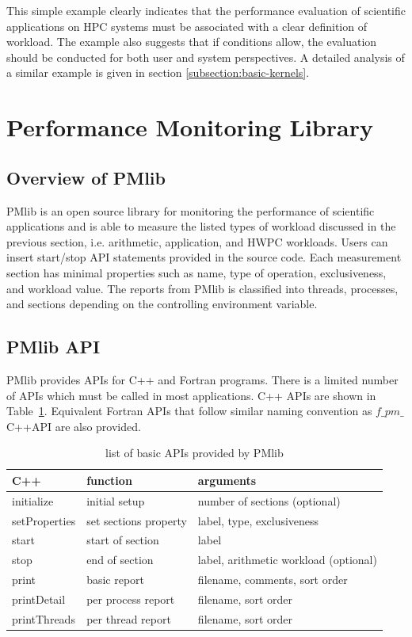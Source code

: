 \documentclass[conference]{IEEEtran}
\begin{document}
This simple example clearly indicates that the performance evaluation of
scientific applications on HPC systems must be associated with a clear
definition of workload. The example also suggests that if conditions allow, the evaluation should be
conducted for both user and system perspectives.
A detailed analysis of a similar example is given in section
\ref{subsection:basic-kernels}.

\section{Performance Monitoring Library}
\label{section:PMlib}

%
\subsection {Overview of PMlib}
PMlib is an open source library for monitoring the performance of scientific
applications and is able to measure the listed types of workload discussed
in the previous section, i.e. arithmetic, application, and HWPC workloads.
Users can insert start/stop API statements provided in the source code.
Each measurement section has minimal properties such as name, type of operation,
exclusiveness, and workload value.
The reports from PMlib is classified into threads, processes, and sections
depending on the controlling environment variable.

%
\subsection{PMlib API}
PMlib provides APIs for C++ and Fortran programs.
There is a limited number of APIs which must be called in most applications.
C++ APIs are shown in Table~\ref{tab:PMlib-API}. 
Equivalent Fortran APIs that follow similar naming convention as
$f\_pm\_${\footnotesize{C++API}} are also provided.

\begin{table}[htb]
\scriptsize
\caption{list of basic APIs provided by PMlib}
\label{tab:PMlib-API}
\footnotesize
\begin{tabular}{l|l|l} \hline
\scriptsize
C++	& function	&	arguments	\\ \hline \hline
initialize	& initial setup	& number of sections (optional)	\\ %
setProperties	& set sections property	& label, type, exclusiveness \\ %
start	& start of section	& label \\ %
stop	& end of section	& label, arithmetic workload (optional)	\\ %
print	& basic report	& filename, comments, sort order	\\ %
printDetail	& per process report	& filename, sort order	\\ %
printThreads	& per thread report	& filename, sort order	\\ \hline
\end{tabular}
\end{table}
\end{document}
